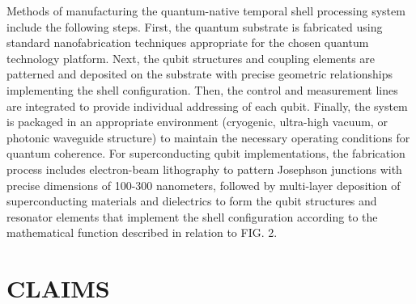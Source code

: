 \documentclass[12pt,letterpaper]{article}
\begin{document}
Methods of manufacturing the quantum-native temporal shell processing system include the following steps. First, the quantum substrate is fabricated using standard nanofabrication techniques appropriate for the chosen quantum technology platform. Next, the qubit structures and coupling elements are patterned and deposited on the substrate with precise geometric relationships implementing the shell configuration. Then, the control and measurement lines are integrated to provide individual addressing of each qubit. Finally, the system is packaged in an appropriate environment (cryogenic, ultra-high vacuum, or photonic waveguide structure) to maintain the necessary operating conditions for quantum coherence. For superconducting qubit implementations, the fabrication process includes electron-beam lithography to pattern Josephson junctions with precise dimensions of 100-300 nanometers, followed by multi-layer deposition of superconducting materials and dielectrics to form the qubit structures and resonator elements that implement the shell configuration according to the mathematical function described in relation to FIG. 2.

\newpage
\section*{CLAIMS}
\end{document}
